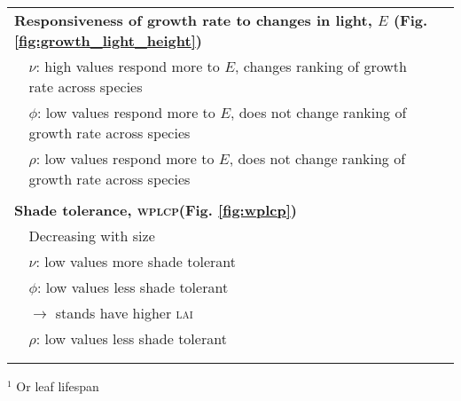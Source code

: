 \documentclass[a4paper,11pt]{article}
\begin{document}
\begin{table}[ht]
{{\begin{tabular}{p{0.1cm}p{9cm}p{6cm}}
  \\ \multicolumn{3}{l}{\bf{Responsiveness of growth rate to changes in light, $E$} (Fig. \ref{fig:growth_light_height})}\\
  & $\nu$: high values respond more to $E$, changes ranking of growth rate across species & \\
  & $\phi$: low values respond more to $E$, does not change ranking of growth rate across species & \\
  & $\rho$: low values respond more to $E$, does not change ranking of growth rate across species & \citet{Ruger-2012}\\

  \\ \multicolumn{3}{l}{\bf{Shade tolerance, \textsc{wplcp}}(Fig. \ref{fig:wplcp})}\\
  & Decreasing with size & \citet{Givnish-1988, Lusk-2008}\\
  & $\nu$: low values more shade tolerant &  \citet{Baltzer-2007}\\
  & $\phi$: low values less shade tolerant & \citet{Poorter-2006, Baltzer-2007, Lusk-2008}\\
  & \quad $\rightarrow$ stands have higher \textsc{lai} &  \citet{Reich-1992, Gower-1993, Niinemets-2010} \\
  & $\rho$: low values less shade tolerant  &  \citet{Osunkoya-1996}\\
  \\ \hline
  \\
  \end{tabular}
  }
$^1$ Or leaf lifespan
}
\label{tab:phenomena}
\end{table}

\newpage
\end{document}
